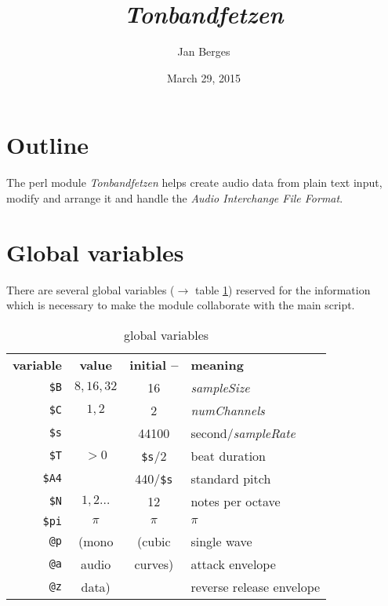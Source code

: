 \documentclass[a4paper, 10pt]{article}
\title{\itshape \ttfamily Tonbandfetzen}
\author{Jan Berges}
\date{March 29, 2015}
\begin{document}
	\maketitle
	
	\section*{Outline}
	
	The perl module {\it Tonbandfetzen} helps create audio data from plain text input, modify and arrange it and handle the {\it Audio Interchange File Format}.
	
	\section*{Global variables}
	
	There are several global variables ($\rightarrow$ table \ref{variables}) reserved for the information which is necessary to make the module collaborate with the main script.
	\begin{table}[H]
		\centering
		\begin{tabular}
		    { r            c              c                  l }
			{\bf variable} & {\bf value}  & {\bf initial --} & {\bf meaning}            \\
			\verb|$B|      & $8, 16, 32$  & 16               & {\it sampleSize}         \\
			\verb|$C|      & $1, 2$       & 2                & {\it numChannels}        \\
			\verb|$s|      &              & 44100            & second/{\it sampleRate}  \\
			\verb|$T|      & $> 0$        & \verb|$s|/2      & beat duration            \\
			\verb|$A4|     &              & 440/\verb|$s|    & standard pitch           \\
			\verb|$N|      & $1, 2\hdots$ & 12               & notes per octave         \\
			\verb|$pi|     & $\pi$        & $\pi$            & $\pi$                    \\
			\verb|@p|      & (mono        & (cubic           & single wave              \\
			\verb|@a|      & audio        & curves)          & attack envelope          \\
			\verb|@z|      & data)        &                  & reverse release envelope \\
		\end{tabular}
		\caption{global variables}
		\label{variables}
	\end{table}
	
\end{document}
